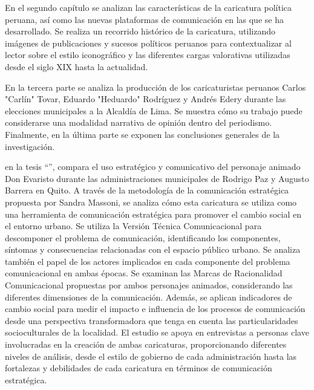 \documentclass[12pt,a4paper]{article}
\begin{document}
En el segundo capítulo se analizan las características de la caricatura política peruana, así como las nuevas plataformas de comunicación en las que se ha desarrollado. Se realiza un recorrido histórico de la caricatura, utilizando imágenes de publicaciones y sucesos políticos peruanos para contextualizar al lector sobre el estilo iconográfico y las diferentes cargas valorativas utilizadas desde el siglo XIX hasta la actualidad.

En la tercera parte se analiza la producción de los caricaturistas peruanos Carlos "Carlín" Tovar, Eduardo "Heduardo" Rodríguez y Andrés Edery durante las elecciones municipales a la Alcaldía de Lima. Se muestra cómo su trabajo puede considerarse una modalidad narrativa de opinión dentro del periodismo.
Finalmente, en la última parte se exponen las conclusiones generales de la investigación.


\cite{vergel_loo_imagenes_2008} en la tesis ``'', compara el uso estratégico y comunicativo del personaje animado Don Evaristo durante las administraciones municipales de Rodrigo Paz y Augusto Barrera en Quito. A través de la metodología de la comunicación estratégica propuesta por Sandra Massoni, se analiza cómo esta caricatura se utiliza como una herramienta de comunicación estratégica para promover el cambio social en el entorno urbano. Se utiliza la Versión Técnica Comunicacional para descomponer el problema de comunicación, identificando los componentes, síntomas y consecuencias relacionadas con el espacio público urbano. Se analiza también el papel de los actores implicados en cada componente del problema comunicacional en ambas épocas. Se examinan las Marcas de Racionalidad Comunicacional propuestas por ambos personajes animados, considerando las diferentes dimensiones de la comunicación. Además, se aplican indicadores de cambio social para medir el impacto e influencia de los procesos de comunicación desde una perspectiva transformadora que tenga en cuenta las particularidades socioculturales de la localidad. El estudio se apoya en entrevistas a personas clave involucradas en la creación de ambas caricaturas, proporcionando diferentes niveles de análisis, desde el estilo de gobierno de cada administración hasta las fortalezas y debilidades de cada caricatura en términos de comunicación estratégica.
\end{document}
